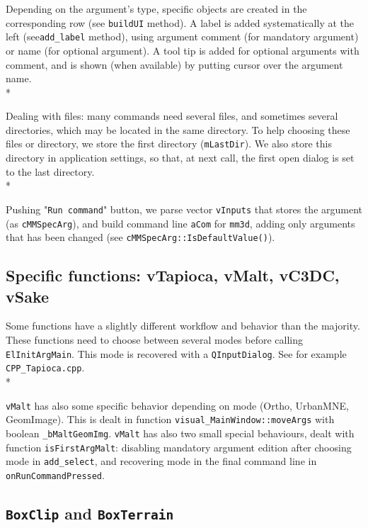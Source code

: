 \documentclass[a4paper]{book}
\begin{document}
Depending on the argument's type, specific objects are created in the corresponding row (see {\tt buildUI} method). A label is added systematically at the left (see{\tt add\_label} method), using argument comment (for mandatory argument) or name (for optional argument). A tool tip is added for optional arguments with comment, and is shown (when available) by putting cursor over the argument name.\\*

Dealing with files: many commands need several files, and sometimes several directories, which may be located in the same directory. To help choosing these files or directory, we store the first directory ({\tt mLastDir}). We also store this directory in application settings, so that, at next call, the first open dialog is set to the last directory.\\*

Pushing "{\tt Run command}" button, we parse vector {\tt vInputs} that stores the argument (as {\tt cMMSpecArg}), and build command line {\tt aCom} for {\tt mm3d}, adding only arguments that has been changed (see {\tt cMMSpecArg::IsDefaultValue()}).

\subsection{Specific functions: vTapioca, vMalt, vC3DC, vSake}

Some functions have a slightly different workflow and behavior than the majority. These functions need to choose between several modes before calling {\tt ElInitArgMain}. This mode is recovered with a {\tt QInputDialog}. See for example {\tt CPP\_Tapioca.cpp}.\\*

{\tt vMalt} has also some specific behavior depending on mode (Ortho, UrbanMNE, GeomImage). This is dealt in function {\tt visual\_MainWindow::moveArgs} with boolean {\tt \_bMaltGeomImg}. {\tt vMalt} has also two small special behaviours, dealt with function {\tt isFirstArgMalt}: disabling mandatory argument edition after choosing mode in {\tt add\_select}, and recovering mode in the final command line in {\tt onRunCommandPressed}.

\subsection{ {\tt BoxClip} and  {\tt BoxTerrain} }
\end{document}
